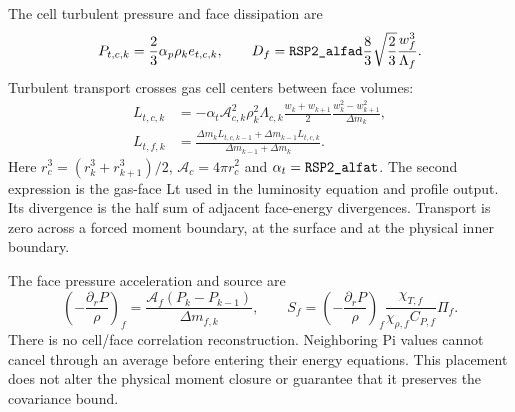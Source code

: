 \documentclass[11pt]{article}
\newcommand{\code}[1]{\texttt{\detokenize{#1}}}
\newcommand{\area}{\mathcal A}
\newcommand{\buo}{\left(-\frac{\partial_r P}{\rho}\right)}
\numberwithin{equation}{section}
\begin{document}
The cell turbulent pressure and face dissipation are
\begin{equation}
 P_{t,c,k}=\frac23\alpha_p\rho_ke_{t,c,k},\qquad
 D_f=\code{RSP2_alfad}\frac83\sqrt{\frac23}\frac{w_f^3}{\Lambda_f}.
\end{equation}
Turbulent transport crosses gas cell centers between face volumes:
\begin{align}
 L_{t,c,k}&=-\alpha_t\area_{c,k}^2\rho_k^2\Lambda_{c,k}
 \frac{w_k+w_{k+1}}2\frac{w_k^2-w_{k+1}^2}{\Delta m_k},
 \label{eq:Lt}\\
 L_{t,f,k}&=\frac{\Delta m_kL_{t,c,k-1}+\Delta m_{k-1}L_{t,c,k}}
 {\Delta m_{k-1}+\Delta m_k}.
\end{align}
Here $r_c^3=(r_k^3+r_{k+1}^3)/2$, $\area_c=4\pi r_c^2$ and
$\alpha_t=\code{RSP2_alfat}$. The second expression is the gas-face Lt
used in the luminosity equation and profile output. Its divergence is the
half sum of adjacent face-energy divergences. Transport is zero across a
forced moment boundary, at the surface and at the physical inner boundary.

The face pressure acceleration and source are
\begin{equation}
 \buo_f=\frac{\area_f(P_k-P_{k-1})}{\Delta m_{f,k}},\qquad
 S_f=\buo_f\frac{\chi_{T,f}}{\chi_{\rho,f}C_{P,f}}\Pi_f.
 \label{eq:source}
\end{equation}
There is no cell/face correlation reconstruction. Neighboring Pi values
cannot cancel through an average before entering their energy equations.
This placement does not alter the physical moment closure or guarantee
that it preserves the covariance bound.

\clearpage
\end{document}
